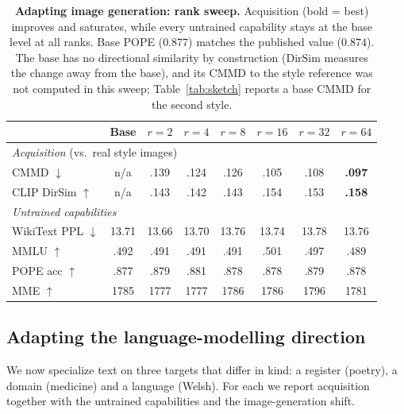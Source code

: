 \documentclass{article}
\begin{document}
\begin{table}[t]
\caption{\textbf{Adapting image generation: rank sweep.} Acquisition (bold =
best) improves and saturates, while every untrained capability stays at the base
level at all ranks. Base POPE ($0.877$) matches the published value ($0.874$).
The base has no directional similarity by construction (DirSim measures the
change away from the base), and its CMMD to the style reference was not computed
in this sweep; Table~\ref{tab:sketch} reports a base CMMD for the second style.}
\label{tab:rank}
\centering\small
\begin{tabular}{lccccccc}
\toprule
& Base & $r{=}2$ & $r{=}4$ & $r{=}8$ & $r{=}16$ & $r{=}32$ & $r{=}64$ \\
\midrule
\multicolumn{8}{l}{\emph{Acquisition} (vs.\ real style images)}\\
CMMD $\downarrow$        & n/a & .139 & .124 & .126 & .105 & .108 & \textbf{.097} \\
CLIP DirSim $\uparrow$   & n/a & .143 & .142 & .143 & .154 & .153 & \textbf{.158} \\
\midrule
\multicolumn{8}{l}{\emph{Untrained capabilities}}\\
WikiText PPL $\downarrow$ & 13.71 & 13.66 & 13.70 & 13.76 & 13.74 & 13.78 & 13.76 \\
MMLU $\uparrow$           & .492 & .491 & .491 & .491 & .501 & .497 & .489 \\
POPE acc $\uparrow$       & .877 & .879 & .881 & .878 & .878 & .879 & .878 \\
MME $\uparrow$            & 1785 & 1777 & 1777 & 1786 & 1786 & 1796 & 1781 \\
\bottomrule
\end{tabular}
\end{table}

\subsection{Adapting the language-modelling direction}
\label{sec:text}
We now specialize text on three targets that differ in kind: a register
(poetry), a domain (medicine) and a language (Welsh). For each we report
acquisition together with the untrained capabilities and the image-generation
shift.
\end{document}
